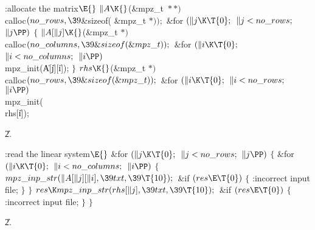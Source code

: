 \B{}:allocate the matrix\X${}\E{}$\6
$\|A\K{}$(\&{mpz\_t} ${}{*}{*}){}$ \\{calloc}${}(\\{no\_rows},\39{}$\&{sizeof}(%
\&{mpz\_t} ${}{*}));{}$\6
\&{for} ${}(\|j\K\T{0};{}$ ${}\|j<\\{no\_rows};{}$ ${}\|j\PP){}$\5
${}\{{}$\1\6
${}\|A[\|j]\K{}$(\&{mpz\_t} ${}{*}){}$ \\{calloc}${}(\\{no\_columns},\39%
\&{sizeof}(\&{mpz\_t}));{}$\6
\&{for} ${}(\|i\K\T{0};{}$ ${}\|i<\\{no\_columns};{}$ ${}\|i\PP){}$\1\5
\\{mpz\_init}(\|A[\|j][\|i]);\2\6
\4${}\}{}$\2\6
${}\\{rhs}\K{}$(\&{mpz\_t} ${}{*}){}$ \\{calloc}${}(\\{no\_rows},\39\&{sizeof}(%
\&{mpz\_t}));{}$\6
\&{for} ${}(\|i\K\T{0};{}$ ${}\|i<\\{no\_rows};{}$ ${}\|i\PP){}$\1\5
\\{mpz\_init}(\\{rhs}[\|i]);\2\par
\U2.\fi

\B{}:read the linear system\X${}\E{}$\6
\&{for} ${}(\|j\K\T{0};{}$ ${}\|j<\\{no\_rows};{}$ ${}\|j\PP){}$\5
${}\{{}$\1\6
\&{for} ${}(\|i\K\T{0};{}$ ${}\|i<\\{no\_columns};{}$ ${}\|i\PP){}$\5
${}\{{}$\1\6
${}\\{mpz\_inp\_str}(\|A[\|j][\|i],\39\\{txt},\39\T{10});{}$\6
\&{if} ${}(\\{res}\E\T{0}){}$\5
${}\{{}$\1\6
:incorrect input file\X;\6
\4${}\}{}$\2\6
\4${}\}{}$\2\6
${}\\{res}\K\\{mpz\_inp\_str}(\\{rhs}[\|j],\39\\{txt},\39\T{10});{}$\6
\&{if} ${}(\\{res}\E\T{0}){}$\5
${}\{{}$\1\6
:incorrect input file\X;\6
\4${}\}{}$\2\6
\4${}\}{}$\2\par
\U2.\fi

